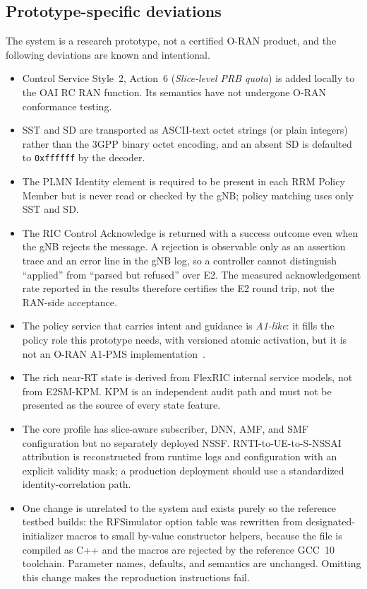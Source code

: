 \subsection{Prototype-specific deviations}
The system is a research prototype, not a certified O-RAN product, and the following deviations are known and intentional.
\begin{itemize}
  \item Control Service Style~2, Action~6 (\emph{Slice-level PRB quota}) is added locally to the OAI RC RAN function. Its semantics have not undergone O-RAN conformance testing.
  \item SST and SD are transported as ASCII-text octet strings (or plain integers) rather than the 3GPP binary octet encoding, and an absent SD is defaulted to \texttt{0xffffff} by the decoder.
  \item The PLMN Identity element is required to be present in each RRM Policy Member but is never read or checked by the gNB; policy matching uses only SST and SD.
  \item The RIC Control Acknowledge is returned with a success outcome even when the gNB rejects the message. A rejection is observable only as an assertion trace and an error line in the gNB log, so a controller cannot distinguish ``applied'' from ``parsed but refused'' over E2. The measured acknowledgement rate reported in the results therefore certifies the E2 round trip, not the RAN-side acceptance.
  \item The policy service that carries intent and guidance is \emph{A1-like}: it fills the policy role this prototype needs, with versioned atomic activation, but it is not an O-RAN A1-PMS implementation~\cite{oran_a1}.
  \item The rich near-RT state is derived from FlexRIC internal service models, not from E2SM-KPM. KPM is an independent audit path and must not be presented as the source of every state feature.
  \item The core profile has slice-aware subscriber, DNN, AMF, and SMF configuration but no separately deployed NSSF. RNTI-to-UE-to-S-NSSAI attribution is reconstructed from runtime logs and configuration with an explicit validity mask; a production deployment should use a standardized identity-correlation path.
  \item One change is unrelated to the system and exists purely so the reference testbed builds: the RFSimulator option table was rewritten from designated-initializer macros to small by-value constructor helpers, because the file is compiled as C++ and the macros are rejected by the reference GCC~10 toolchain. Parameter names, defaults, and semantics are unchanged. Omitting this change makes the reproduction instructions fail.
\end{itemize}

